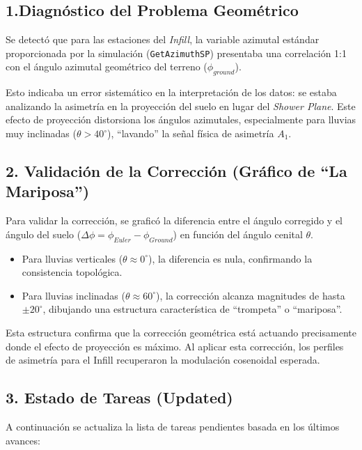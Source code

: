 \subsection*{1.Diagnóstico del Problema Geométrico}

Se detectó que para las estaciones del \textit{Infill}, la variable azimutal estándar proporcionada por la simulación (\texttt{GetAzimuthSP}) presentaba una correlación 1:1 con el ángulo azimutal geométrico del terreno ($\phi_{ground}$).

Esto indicaba un error sistemático en la interpretación de los datos: se estaba analizando la asimetría en la proyección del suelo en lugar del \textit{Shower Plane}. Este efecto de proyección distorsiona los ángulos azimutales, especialmente para lluvias muy inclinadas ($\theta > 40^{\circ}$), ``lavando'' la señal física de asimetría $A_1$.

\subsection*{2. Validación de la Corrección (Gráfico de ``La Mariposa'')}

Para validar la corrección, se graficó la diferencia entre el ángulo corregido y el ángulo del suelo ($\Delta \phi = \phi_{Euler} - \phi_{Ground}$) en función del ángulo cenital $\theta$.

\begin{itemize}
	\item Para lluvias verticales ($\theta \approx 0^{\circ}$), la diferencia es nula, confirmando la consistencia topológica.
	\item Para lluvias inclinadas ($\theta \approx 60^{\circ}$), la corrección alcanza magnitudes de hasta $\pm 20^{\circ}$, dibujando una estructura característica de ``trompeta'' o ``mariposa''.
\end{itemize}

Esta estructura confirma que la corrección geométrica está actuando precisamente donde el efecto de proyección es máximo. Al aplicar esta corrección, los perfiles de asimetría para el Infill recuperaron la modulación cosenoidal esperada.

\subsection*{3. Estado de Tareas (Updated)}

A continuación se actualiza la lista de tareas pendientes basada en los últimos avances:

